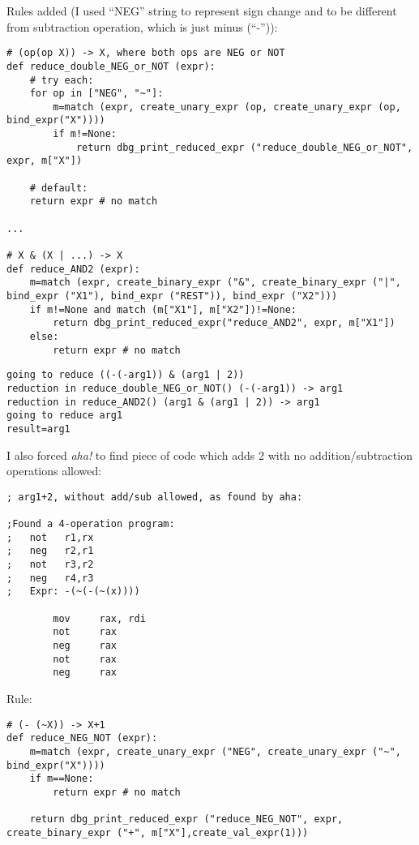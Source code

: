 Rules added (I used ``NEG'' string to represent sign change and to be different from subtraction operation,
which is just minus (``-'')):

\label{AND2}
\begin{lstlisting}
# (op(op X)) -> X, where both ops are NEG or NOT
def reduce_double_NEG_or_NOT (expr):
    # try each:
    for op in ["NEG", "~"]:
        m=match (expr, create_unary_expr (op, create_unary_expr (op, bind_expr("X"))))
        if m!=None:
            return dbg_print_reduced_expr ("reduce_double_NEG_or_NOT", expr, m["X"])

    # default:
    return expr # no match

...

# X & (X | ...) -> X
def reduce_AND2 (expr):
    m=match (expr, create_binary_expr ("&", create_binary_expr ("|", bind_expr ("X1"), bind_expr ("REST")), bind_expr ("X2")))
    if m!=None and match (m["X1"], m["X2"])!=None:
        return dbg_print_reduced_expr("reduce_AND2", expr, m["X1"])
    else:
        return expr # no match
\end{lstlisting}

\begin{lstlisting}
going to reduce ((-(-arg1)) & (arg1 | 2))
reduction in reduce_double_NEG_or_NOT() (-(-arg1)) -> arg1
reduction in reduce_AND2() (arg1 & (arg1 | 2)) -> arg1
going to reduce arg1
result=arg1
\end{lstlisting}

I also forced \textit{aha!} to find piece of code which adds 2 with no addition/subtraction operations allowed:

\begin{lstlisting}
; arg1+2, without add/sub allowed, as found by aha:

;Found a 4-operation program:
;   not   r1,rx
;   neg   r2,r1
;   not   r3,r2
;   neg   r4,r3
;   Expr: -(~(-(~(x))))

        mov     rax, rdi
        not     rax
        neg     rax
        not     rax
        neg     rax
\end{lstlisting}

Rule:

\begin{lstlisting}
# (- (~X)) -> X+1
def reduce_NEG_NOT (expr):
    m=match (expr, create_unary_expr ("NEG", create_unary_expr ("~", bind_expr("X"))))
    if m==None:
        return expr # no match
    
    return dbg_print_reduced_expr ("reduce_NEG_NOT", expr, create_binary_expr ("+", m["X"],create_val_expr(1)))
\end{lstlisting}

